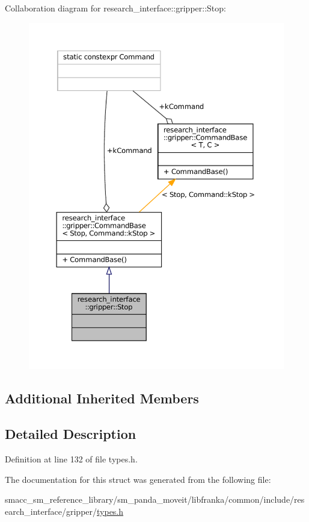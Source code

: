 Collaboration diagram for research\+\_\+interface\+:\+:gripper\+:\+:Stop\+:
\nopagebreak
\begin{figure}[H]
\begin{center}
\leavevmode
\includegraphics[width=350pt]{structresearch__interface_1_1gripper_1_1Stop__coll__graph}
\end{center}
\end{figure}
\subsection*{Additional Inherited Members}


\subsection{Detailed Description}


Definition at line 132 of file types.\+h.



The documentation for this struct was generated from the following file\+:\begin{DoxyCompactItemize}
\item 
smacc\+\_\+sm\+\_\+reference\+\_\+library/sm\+\_\+panda\+\_\+moveit/libfranka/common/include/research\+\_\+interface/gripper/\hyperlink{types_8h}{types.\+h}\end{DoxyCompactItemize}
